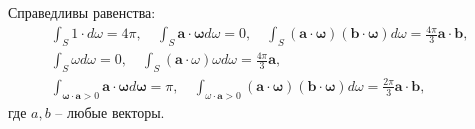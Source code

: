 \begin{lemma}
    \label{lm:1:1}
    Справедливы равенства:
\[
    \begin{gathered}
        \int_{S} 1 \cdot d \omega=4 \pi, \quad \int_{S} \mathbf{a}
        \cdot \boldsymbol{\omega} d \omega=0,
        \quad \int_{S}(\mathbf{a} \cdot \boldsymbol{\omega})(\mathbf{b} \cdot \boldsymbol{\omega}) d
        \omega=\frac{4 \pi}{3} \mathbf{a} \cdot \mathbf{b}, \\
        \int_{S} \omega d \omega=0, \quad \int_{S}(\mathbf{a} \cdot \omega) \omega d
        \omega=\frac{4 \pi}{3} \mathbf{a}, \\
        \int_{\boldsymbol{\omega} \cdot \mathbf{a}>0} \mathbf{a} \cdot \boldsymbol{\omega} d
        \boldsymbol{\omega}=\pi, \quad \int_{\omega \cdot \mathbf{a}>0}(\mathbf{a} \cdot
        \boldsymbol{\omega})(\mathbf{b} \cdot \boldsymbol{\omega}) d \omega
        =\frac{2 \pi}{3} \mathbf{a} \cdot \mathbf{b},
    \end{gathered}
\]
где $a, b$ -- любые векторы.
\end{lemma}
